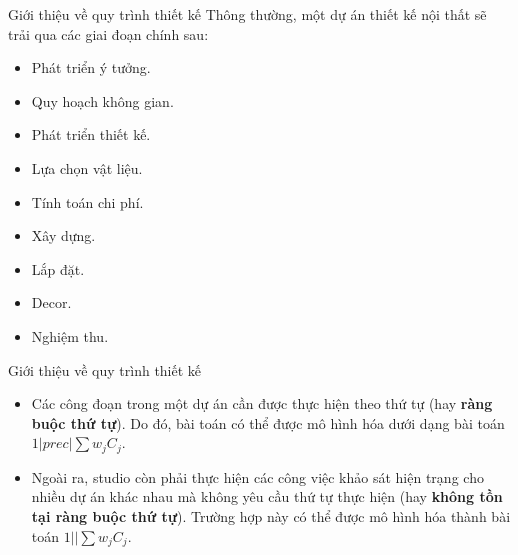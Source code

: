 \documentclass[10pt]{beamer}
\begin{document}
\begin{frame}{Giới thiệu về quy trình thiết kế}
Thông thường, một dự án thiết kế nội thất sẽ trải qua các giai đoạn chính sau:
\begin{itemize}
\item Phát triển ý tưởng.
\item Quy hoạch không gian.
\item Phát triển thiết kế.
\item Lựa chọn vật liệu.
\item Tính toán chi phí.
\item Xây dựng.
\item Lắp đặt.
\item Decor.
\item Nghiệm thu.
\end{itemize}
\end{frame}

\begin{frame}{Giới thiệu về quy trình thiết kế}
    
\begin{itemize}
\item<1-> Các công đoạn trong một dự án cần được thực hiện theo thứ tự (hay \textbf{ràng buộc thứ tự}). Do đó, bài toán có thể được mô hình hóa dưới dạng bài toán $1|prec|\sum w_j C_j$.

\item<2-> Ngoài ra, studio còn phải thực hiện các công việc khảo sát hiện trạng cho nhiều dự án khác nhau mà không yêu cầu thứ tự thực hiện (hay \textbf{không tồn tại ràng buộc thứ tự}). Trường hợp này có thể được mô hình hóa thành bài toán $1||\sum w_j C_j$.
\end{itemize}
\end{frame}
\end{document}
